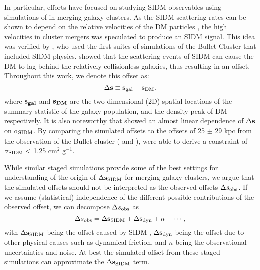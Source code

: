 In particular, efforts have focused on studying SIDM observables 
using simulations of in merging galaxy clusters.
As the SIDM scattering rates can be shown to depend on the 
relative velocities of the DM particles \citep{Markevitch2004}, the high velocities 
in cluster mergers was speculated to produce an SIDM signal. This idea was verified by 
\cite{Randall2008d}, who used the first suites of simulations of the
Bullet Cluster that included SIDM physics. 
\cite{Randall2008d} showed that the scattering events of SIDM can cause the DM
to lag behind the relatively collisionless galaxies, thus resulting in an offset.
Throughout this work, we denote this offset as:
\begin{equation}
	\Delta {\bf s} \equiv {\bf s}_{\rm gal} - {\bf s}_{\rm DM}.
	\label{eq:offset}
\end{equation}
where $\bf{s}_{gal}$ and $\bf{s}_{DM}$ are the two-dimensional (2D) spatial
locations of the summary statistic of the galaxy population, and the density
peak of DM respectively. 
It is also noteworthy that \cite{Randall2008d} showed an almost linear dependence of
$\Delta {\bf s}$ on $\sigma_{\rm SIDM}$. 
By comparing the simulated offsets to the offsets of 25 $\pm$ 29 kpc from 
the observation of the Bullet cluster
(\citealt{Markevitch2004} and \citealt{Bradac2006b}),
\cite{Randall2008d} were able to derive a constraint of $\sigma_{\rm SIDM} <$ 
1.25 cm$^2$ g$^{-1}$.  

While similar staged simulations provide some of the best settings 
for understanding of the origin of $\Delta {\bf s}_{{\rm SIDM}}$
for merging galaxy clusters, 
we argue that the simulated offsets should not be interpreted as the observed
offsets $\Delta s_{\rm obs}$.
If we assume (statistical) independence of 
the different possible contributions of the observed 
offset, we can decompose $\Delta s_{\rm obs}$  as
\begin{equation}
	\Delta s_{\rm obs} = \Delta {\bf s}_{{\rm SIDM}} + \Delta {\bf s}_{\rm dyn} + n + \cdots,
	\label{eq:signal_and_noise}
\end{equation}
with $\Delta {\bf s}_{{\rm SIDM}}$ being the offset caused by SIDM , 
$\Delta {\bf s}_{\rm dyn}$ being the offset due to other physical causes such as
dynamical friction, and $n$ being the observational uncertainties and noise.
At best the simulated offset from these staged simulations 
can approximate the $\Delta {\bf s}_{{\rm SIDM}}$ term.


